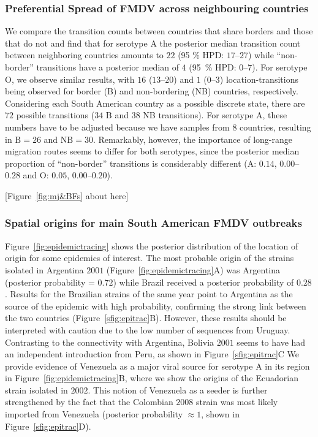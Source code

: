 \documentclass[10pt]{article}
\begin{document}
\subsubsection*{Preferential Spread of FMDV across neighbouring countries}

We compare the transition counts between countries that share borders and those that do not and find that for serotype A the posterior median transition count between neighboring countries amounts to $22$ (95 \% HPD: $17$--$27$) while ``non-border'' transitions have a posterior median of $4$ (95~\% HPD: $0$--$7$). 
For serotype O, we observe similar results, with $16$ ($13$--$20$) and $1$ ($0$--$3$) location-transitions being observed for border (B) and non-bordering (NB) countries, respectively.
Considering each South American country as a possible discrete state, there are $72$ possible transitions ($34$ B and $38$ NB transitions).
For serotype A, these numbers have to be adjusted because we have samples from $8$ countries, resulting in $\text{B} = 26$ and $\text{NB} = 30$.
Remarkably, however, the importance of long-range migration routes seems to differ for both serotypes, since the posterior median proportion of ``non-border'' transitions is considerably different (A: $0.14$, $0.00$--$0.28$  and O: $0.05$, $0.00$--$0.20$).

\begin{center}
 [Figure~\ref{fig:mj&BFs} about here]
\end{center}

\subsubsection*{Spatial origins for main South American FMDV outbreaks}

Figure~\ref{fig:epidemictracing} shows the posterior distribution of the location of origin for some epidemics of interest.
The most probable origin of the strains isolated in Argentina $2001$ (Figure~\ref{fig:epidemictracing}A) was Argentina (posterior probability = $0.72$) while Brazil received a posterior probability of $0.28$.
Results for the Brazilian strains of the same year point to Argentina as the source of the epidemic with high probability, confirming the strong link between the two countries (Figure~\ref{sfig:epitrac}B).
However, these results should be interpreted with caution due to the low number of sequences from Uruguay.
Contrasting to the connectivity with Argentina, Bolivia $2001$ seems to have had an independent introduction from Peru, as shown in Figure~\ref{sfig:epitrac}C
We provide evidence of Venezuela as a major viral source for serotype A in its region in Figure~\ref{fig:epidemictracing}B, where we show the origins of the Ecuadorian strain isolated in $2002$.
This notion of Venezuela as a seeder is further strengthened by the fact that the Colombian $2008$ strain was most likely imported from Venezuela (posterior probability $\approx 1$, shown in Figure~\ref{sfig:epitrac}D).
\end{document}
